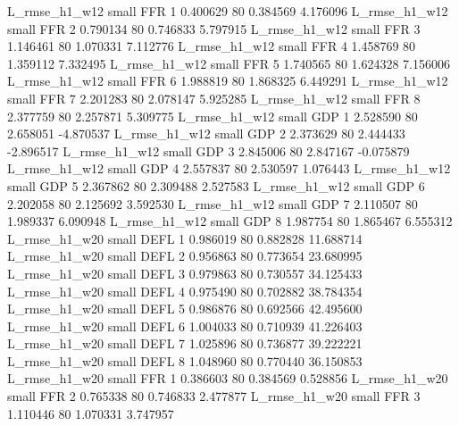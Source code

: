  L_rmse_h1_w12      small      FFR                 1 0.400629 80       0.384569           4.176096
 L_rmse_h1_w12      small      FFR                 2 0.790134 80       0.746833           5.797915
 L_rmse_h1_w12      small      FFR                 3 1.146461 80       1.070331           7.112776
 L_rmse_h1_w12      small      FFR                 4 1.458769 80       1.359112           7.332495
 L_rmse_h1_w12      small      FFR                 5 1.740565 80       1.624328           7.156006
 L_rmse_h1_w12      small      FFR                 6 1.988819 80       1.868325           6.449291
 L_rmse_h1_w12      small      FFR                 7 2.201283 80       2.078147           5.925285
 L_rmse_h1_w12      small      FFR                 8 2.377759 80       2.257871           5.309775
 L_rmse_h1_w12      small      GDP                 1 2.528590 80       2.658051          -4.870537
 L_rmse_h1_w12      small      GDP                 2 2.373629 80       2.444433          -2.896517
 L_rmse_h1_w12      small      GDP                 3 2.845006 80       2.847167          -0.075879
 L_rmse_h1_w12      small      GDP                 4 2.557837 80       2.530597           1.076443
 L_rmse_h1_w12      small      GDP                 5 2.367862 80       2.309488           2.527583
 L_rmse_h1_w12      small      GDP                 6 2.202058 80       2.125692           3.592530
 L_rmse_h1_w12      small      GDP                 7 2.110507 80       1.989337           6.090948
 L_rmse_h1_w12      small      GDP                 8 1.987754 80       1.865467           6.555312
 L_rmse_h1_w20      small     DEFL                 1 0.986019 80       0.882828          11.688714
 L_rmse_h1_w20      small     DEFL                 2 0.956863 80       0.773654          23.680995
 L_rmse_h1_w20      small     DEFL                 3 0.979863 80       0.730557          34.125433
 L_rmse_h1_w20      small     DEFL                 4 0.975490 80       0.702882          38.784354
 L_rmse_h1_w20      small     DEFL                 5 0.986876 80       0.692566          42.495600
 L_rmse_h1_w20      small     DEFL                 6 1.004033 80       0.710939          41.226403
 L_rmse_h1_w20      small     DEFL                 7 1.025896 80       0.736877          39.222221
 L_rmse_h1_w20      small     DEFL                 8 1.048960 80       0.770440          36.150853
 L_rmse_h1_w20      small      FFR                 1 0.386603 80       0.384569           0.528856
 L_rmse_h1_w20      small      FFR                 2 0.765338 80       0.746833           2.477877
 L_rmse_h1_w20      small      FFR                 3 1.110446 80       1.070331           3.747957
